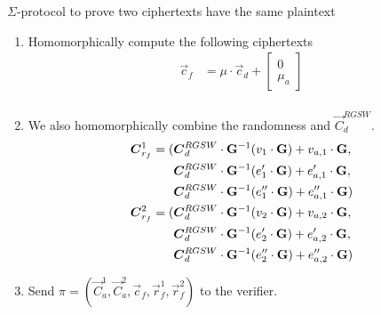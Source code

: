 \begin{section}{$\Sigma$-protocol to prove two ciphertexts have the same plaintext~\label{ProofSamePlaintext}}
\begin{description}
\begin{enumerate}
\begin{align*}
\begin{bmatrix}
            a_2 \cdot v_{a,2} + 2 \cdot e_{a,2}' \end{bmatrix}
        \end{align*}
        \item Homomorphically compute the following ciphertexts
        \begin{align*}
          \vec{c}_f &= \mu \cdot \vec{c}_d + \begin{bmatrix} 0 \\ \mu_a \end{bmatrix}\\
        \end{align*}
        \item We also homomorphically combine the randomness and $\vec{C}^{RGSW}_d$.
        \begin{align*}
          \vec{C}^1_{r_f} = (&\vec{C}^{RGSW}_d \cdot \mat{G}^{-1}(v_1 \cdot \mat{G}) + v_{a,1} \cdot \mat{G}, \\
          & \vec{C}^{RGSW}_d \cdot \mat{G}^{-1}(e_1' \cdot \mat{G}) + e_{a,1}' \cdot \mat{G},\\
          & \vec{C}^{RGSW}_d \cdot \mat{G}^{-1}(e_1'' \cdot \mat{G}) + e_{a,1}'' \cdot \mat{G})\\
          \vec{C}^2_{r_f} = (&\vec{C}^{RGSW}_d \cdot \mat{G}^{-1}(v_2 \cdot \mat{G}) + v_{a,2} \cdot \mat{G}, \\
          & \vec{C}^{RGSW}_d \cdot \mat{G}^{-1}(e_2' \cdot \mat{G}) + e_{a,2}' \cdot \mat{G},\\
          & \vec{C}^{RGSW}_d \cdot \mat{G}^{-1}(e_2'' \cdot \mat{G}) + e_{a,2}'' \cdot \mat{G})\\
        \end{align*}
        \item Send $\pi = (\vec{C}^1_a, \vec{C}^2_a, \vec{c}_f, \vec{r}^1_f, \vec{r}^2_f)$ to the verifier.
      \end{enumerate}





\end{description}
\end{section}
